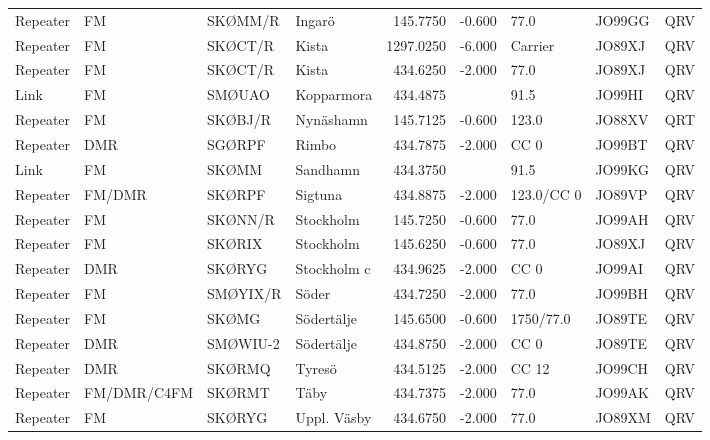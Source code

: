 \begin{landscape}
\begin{longtable}{llllrrlll}
	Repeater & FM          & SKØMM/R  & Ingarö          &     145.7750 &     -0.600 & 77.0       & JO99GG      & QRV      \\
	Repeater & FM          & SKØCT/R  & Kista           &    1297.0250 &     -6.000 & Carrier    & JO89XJ      & QRV      \\
	Repeater & FM          & SKØCT/R  & Kista           &     434.6250 &     -2.000 & 77.0       & JO89XJ      & QRV      \\
	Link     & FM          & SMØUAO   & Kopparmora      &     434.4875 &            & 91.5       & JO99HI      & QRV      \\
	Repeater & FM          & SKØBJ/R  & Nynäshamn       &     145.7125 &     -0.600 & 123.0      & JO88XV      & QRT      \\
	Repeater & DMR         & SGØRPF   & Rimbo           &     434.7875 &     -2.000 & CC 0       & JO99BT      & QRV      \\
	Link     & FM          & SKØMM    & Sandhamn        &     434.3750 &            & 91.5       & JO99KG      & QRV      \\
	Repeater & FM/DMR      & SKØRPF   & Sigtuna         &     434.8875 &     -2.000 & 123.0/CC 0 & JO89VP      & QRV      \\
	Repeater & FM          & SKØNN/R  & Stockholm       &     145.7250 &     -0.600 & 77.0       & JO99AH      & QRV      \\
	Repeater & FM          & SKØRIX   & Stockholm       &     145.6250 &     -0.600 & 77.0       & JO89XJ      & QRV      \\
	Repeater & DMR         & SKØRYG   & Stockholm c     &     434.9625 &     -2.000 & CC 0       & JO99AI      & QRV      \\
	Repeater & FM          & SMØYIX/R & Söder           &     434.7250 &     -2.000 & 77.0       & JO99BH      & QRV      \\
	Repeater & FM          & SKØMG    & Södertälje      &     145.6500 &     -0.600 & 1750/77.0  & JO89TE      & QRV      \\
	Repeater & DMR         & SMØWIU-2 & Södertälje      &     434.8750 &     -2.000 & CC 0       & JO89TE      & QRV      \\
	Repeater & DMR         & SKØRMQ   & Tyresö          &     434.5125 &     -2.000 & CC 12      & JO99CH      & QRV      \\
	Repeater & FM/DMR/C4FM & SKØRMT   & Täby            &     434.7375 &     -2.000 & 77.0       & JO99AK      & QRV      \\
	Repeater & FM          & SKØRYG   & Uppl. Väsby     &     434.6750 &     -2.000 & 77.0       & JO89XM      & QRV      \\

\end{longtable}
\end{landscape}
